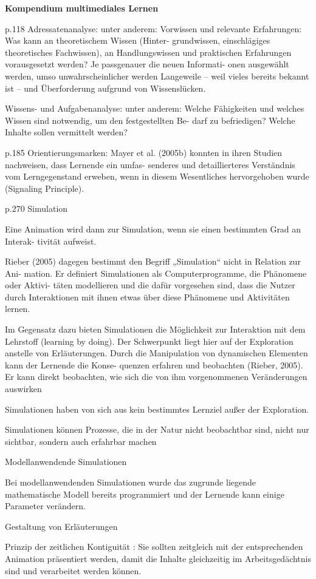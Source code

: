 \textbf{Kompendium multimediales Lernen}

p.118
Adressatenanalyse: unter anderem: 
Vorwissen und relevante Erfahrungen: Was kann an theoretischem Wissen (Hinter-
grundwissen,  einschlägiges  theoretisches  Fachwissen),  an  Handlungswissen  und 
praktischen Erfahrungen vorausgesetzt werden? Je passgenauer die neuen Informati-
onen ausgewählt werden, umso unwahrscheinlicher werden Langeweile – weil vieles 
bereits bekannt ist – und Überforderung aufgrund von Wissenslücken. 

Wissens- und Aufgabenanalyse: unter anderem: 
Welche Fähigkeiten und welches Wissen sind notwendig, um den festgestellten Be-
darf zu befriedigen? Welche Inhalte sollen vermittelt werden? 

p.185
Orientierungsmarken: 
Mayer et al. (2005b) konnten in ihren Studien nachweisen, dass Lernende ein umfas-
senderes und detaillierteres Verständnis vom Lerngegenstand erweben, wenn in diesem 
Wesentliches hervorgehoben wurde (Signaling Principle).

p.270
Simulation

Eine Animation wird dann zur Simulation, wenn sie einen bestimmten Grad an Interak-
tivität aufweist. 

Rieber (2005) dagegen bestimmt den Begriff „Simulation“ nicht in Relation zur Ani-
mation. Er definiert Simulationen als Computerprogramme, die Phänomene oder Aktivi-
täten modellieren und die dafür vorgesehen sind, dass die Nutzer durch Interaktionen 
mit ihnen etwas über diese Phänomene und Aktivitäten lernen.

Im Gegensatz dazu 
bieten  Simulationen  die  Möglichkeit  zur  Interaktion  mit  dem  Lehrstoff  (learning  by 
doing). Der Schwerpunkt liegt hier auf der Exploration anstelle von Erläuterungen. 
Durch die Manipulation von dynamischen Elementen kann der Lernende die Konse-
quenzen erfahren und beobachten (Rieber, 2005). Er kann direkt beobachten, wie sich 
die von ihm vorgenommenen Veränderungen auswirken 

Simulationen  haben  von  sich  aus  kein  bestimmtes  Lernziel  außer  der  Exploration. 

Simulationen  können  Prozesse,  die  in  der  Natur  nicht  beobachtbar  sind,  nicht  nur 
sichtbar, sondern auch erfahrbar machen

Modellanwendende Simulationen 

Bei  modellanwendenden  Simulationen  wurde  das  zugrunde  liegende  mathematische 
Modell bereits programmiert und der Lernende kann einige Parameter verändern. 

Gestaltung von Erläuterungen 

Prinzip der zeitlichen Kontiguität :
Sie sollten zeitgleich mit der entsprechenden Animation präsentiert werden, damit die 
Inhalte gleichzeitig im Arbeitsgedächtnis sind und verarbeitet werden können.